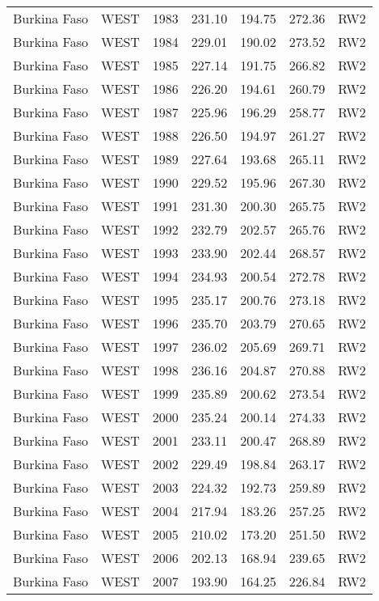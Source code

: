 \begin{longtable}{lllrrrl}
  Burkina Faso & WEST & 1983 & 231.10 & 194.75 & 272.36 & RW2 \\ 
  Burkina Faso & WEST & 1984 & 229.01 & 190.02 & 273.52 & RW2 \\ 
  Burkina Faso & WEST & 1985 & 227.14 & 191.75 & 266.82 & RW2 \\ 
  Burkina Faso & WEST & 1986 & 226.20 & 194.61 & 260.79 & RW2 \\ 
  Burkina Faso & WEST & 1987 & 225.96 & 196.29 & 258.77 & RW2 \\ 
  Burkina Faso & WEST & 1988 & 226.50 & 194.97 & 261.27 & RW2 \\ 
  Burkina Faso & WEST & 1989 & 227.64 & 193.68 & 265.11 & RW2 \\ 
  Burkina Faso & WEST & 1990 & 229.52 & 195.96 & 267.30 & RW2 \\ 
  Burkina Faso & WEST & 1991 & 231.30 & 200.30 & 265.75 & RW2 \\ 
  Burkina Faso & WEST & 1992 & 232.79 & 202.57 & 265.76 & RW2 \\ 
  Burkina Faso & WEST & 1993 & 233.90 & 202.44 & 268.57 & RW2 \\ 
  Burkina Faso & WEST & 1994 & 234.93 & 200.54 & 272.78 & RW2 \\ 
  Burkina Faso & WEST & 1995 & 235.17 & 200.76 & 273.18 & RW2 \\ 
  Burkina Faso & WEST & 1996 & 235.70 & 203.79 & 270.65 & RW2 \\ 
  Burkina Faso & WEST & 1997 & 236.02 & 205.69 & 269.71 & RW2 \\ 
  Burkina Faso & WEST & 1998 & 236.16 & 204.87 & 270.88 & RW2 \\ 
  Burkina Faso & WEST & 1999 & 235.89 & 200.62 & 273.54 & RW2 \\ 
  Burkina Faso & WEST & 2000 & 235.24 & 200.14 & 274.33 & RW2 \\ 
  Burkina Faso & WEST & 2001 & 233.11 & 200.47 & 268.89 & RW2 \\ 
  Burkina Faso & WEST & 2002 & 229.49 & 198.84 & 263.17 & RW2 \\ 
  Burkina Faso & WEST & 2003 & 224.32 & 192.73 & 259.89 & RW2 \\ 
  Burkina Faso & WEST & 2004 & 217.94 & 183.26 & 257.25 & RW2 \\ 
  Burkina Faso & WEST & 2005 & 210.02 & 173.20 & 251.50 & RW2 \\ 
  Burkina Faso & WEST & 2006 & 202.13 & 168.94 & 239.65 & RW2 \\ 
  Burkina Faso & WEST & 2007 & 193.90 & 164.25 & 226.84 & RW2 \\ 

\end{longtable}
